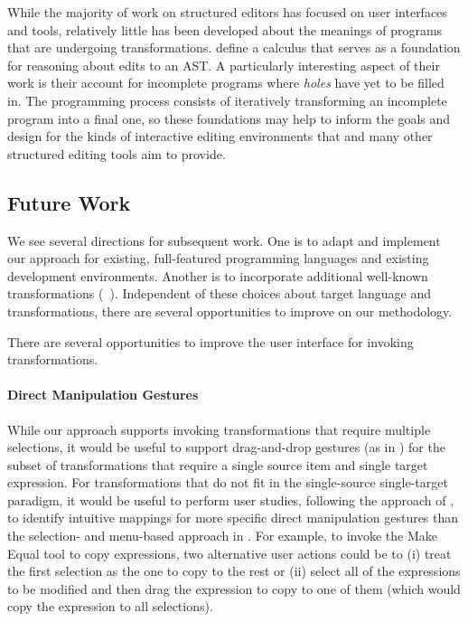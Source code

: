 While the majority of work on structured editors has focused on user
interfaces and tools, relatively little has been developed about the
meanings of programs that are undergoing transformations.
\citet{HazelnutPOPL} define a calculus
that serves as a foundation for reasoning about edits to an AST. A
particularly interesting aspect of their work is their account for
incomplete programs where \emph{holes} have yet to be filled in. The
programming process consists of iteratively transforming an incomplete
program into a final one, so these foundations may help to inform the
goals and design for the kinds of interactive editing environments
that \deuce{} and many other structured editing tools aim to provide.



\subsection{Future Work}

We see several directions for subsequent work. One is to adapt and
implement our approach for existing, full-featured programming
languages and existing development environments. Another is to
incorporate additional well-known transformations
(\eg{}~\cite{Fowler1999,Thompson2013}). Independent of these choices
about target language and transformations, there are several
opportunities to improve on our methodology.


There are several opportunities to improve the user interface for invoking
transformations.


\paragraph{Direct Manipulation Gestures}
While our approach supports invoking transformations
that require multiple selections, it would be useful to support
drag-and-drop gestures (as in \dndr{}) for the subset of transformations
that require a single source item and single target expression.
For transformations that do not fit in the single-source single-target
paradigm, it would be useful to perform user studies, following the
approach of \citet{DNDRefactoring}, to identify intuitive mappings for more
specific direct manipulation gestures than the selection- and
menu-based approach in \deuce{}. For example, to invoke the Make
Equal tool to copy expressions, two alternative user actions could
be to (i) treat the first selection as the one to copy to the rest or
(ii) select all of the expressions to be modified and then drag the
expression to copy to one of them (which would copy the expression to
all selections).

